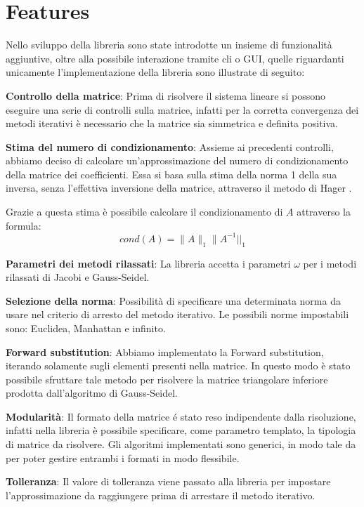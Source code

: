 \section{Features}

Nello sviluppo della libreria sono state introdotte un insieme di funzionalità aggiuntive, oltre alla possibile interazione tramite cli o GUI, quelle riguardanti unicamente l'implementazione della libreria sono illustrate di seguito:

\begin{itemize}
	\begin{item}
		\textbf{Controllo della matrice}: Prima di risolvere il sistema lineare si possono eseguire una serie di controlli sulla matrice, infatti per la corretta convergenza dei metodi iterativi è necessario che la matrice sia simmetrica e definita positiva.
	\end{item}
	\begin{item}
		\textbf{Stima del numero di condizionamento}: Assieme ai precedenti controlli, abbiamo deciso di calcolare un'approssimazione del numero di condizionamento della matrice dei coefficienti. Essa si basa sulla stima della norma 1 della sua inversa, senza l'effettiva inversione della matrice, attraverso il metodo di Hager \cite{hager, hager2}.
		
		Grazie a questa stima è possibile calcolare il condizionamento di $A$ attraverso la formula:
		$$ cond(A) = \|A\|_1  \|A^{-1}||_1$$
			
			\end{item}
	\begin{item}
		\textbf{Parametri dei metodi rilassati}: La libreria accetta i parametri $\omega$ per i metodi rilassati di Jacobi e Gauss-Seidel.
	\end{item}
	\begin{item}
		\textbf{Selezione della norma}: Possibilità di specificare una determinata norma da usare nel criterio di arresto del metodo iterativo. Le possibili norme impostabili sono: Euclidea, Manhattan e infinito.
	\end{item}
	\begin{item}
		\textbf{Forward substitution}: Abbiamo implementato la Forward substitution, iterando solamente sugli elementi presenti nella matrice. In questo modo è stato possibile sfruttare tale metodo per risolvere la matrice triangolare inferiore prodotta dall'algoritmo di Gauss-Seidel.
	\end{item}
	\begin{item}
		\textbf{Modularità}: Il formato della matrice é stato reso indipendente dalla risoluzione, infatti nella libreria è possibile specificare, come parametro templato, la tipologia di matrice da risolvere. Gli algoritmi implementati sono generici, in modo tale da per poter gestire entrambi i formati in modo flessibile.
	\end{item}
	\begin{item}
		\textbf{Tolleranza}: Il valore di tolleranza viene passato alla libreria per impostare l'approssimazione da raggiungere prima di arrestare il metodo iterativo.
	\end{item}


\end{itemize}
